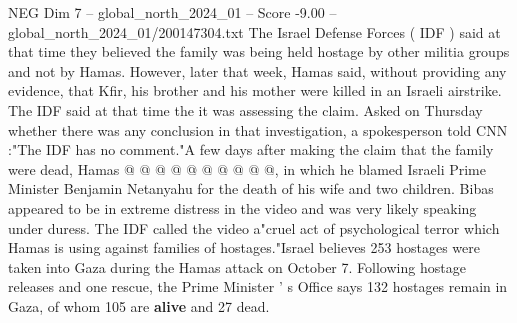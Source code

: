 \begin{textsample}{NEG Dim 7 – global\_north\_2024\_01 – Score -9.00 – global\_north\_2024\_01/200147304.txt}
The Israel Defense Forces ( IDF ) said at that time they believed the family was being held hostage by other militia groups and not by Hamas.
However, later that week, Hamas said, without providing any evidence, that Kfir, his brother and his mother were killed in an Israeli airstrike.
The IDF said at that time the it was assessing the claim.
Asked on Thursday whether there was any conclusion in that investigation, a spokesperson told CNN :"The IDF has no comment."A few days after making the claim that the family were dead, Hamas @ @ @ @ @ @ @ @ @ @, in which he blamed Israeli Prime Minister Benjamin Netanyahu for the death of his wife and two children.
Bibas appeared to be in extreme distress in the video and was very likely speaking under duress.
The IDF called the video a"cruel act of psychological terror which Hamas is using against families of hostages."Israel believes 253 hostages were taken into Gaza during the Hamas attack on October 7.
Following hostage releases and one rescue, the Prime Minister ' s Office says 132 hostages remain in Gaza, of whom 105 are \textbf{alive} and 27 dead.

\end{textsample}
